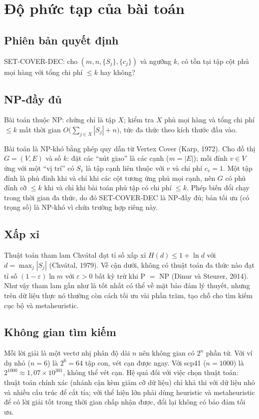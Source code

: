 \documentclass[a4paper,12pt]{article}
\begin{document}
\section{Độ phức tạp của bài toán}
\subsection{Phiên bản quyết định}
SET-COVER-DEC: cho $(m,n,\{S_j\},\{c_j\})$ và ngưỡng $k$, có tồn tại tập cột phủ mọi hàng với tổng chi phí $\le k$ hay không?

\subsection{NP-đầy đủ}
Bài toán thuộc NP: chứng chỉ là tập $X$; kiểm tra $X$ phủ mọi hàng và tổng chi phí $\le k$ mất thời gian $O\bigl(\sum_{j\in X}|S_j|+n\bigr)$, tức đa thức theo kích thước đầu vào.

Bài toán là NP-khó bằng phép quy dẫn từ Vertex Cover (Karp, 1972). Cho đồ thị $G=(V,E)$ và số $k$: đặt các ``nút giao'' là các cạnh ($m=|E|$); mỗi đỉnh $v\in V$ ứng với một ``vị trí'' có $S_v$ là tập cạnh liên thuộc với $v$ và chi phí $c_v=1$. Một tập đỉnh là phủ đỉnh khi và chỉ khi các cột tương ứng phủ mọi cạnh, nên $G$ có phủ đỉnh cỡ $\le k$ khi và chỉ khi bài toán phủ tập có chi phí $\le k$. Phép biến đổi chạy trong thời gian đa thức, do đó SET-COVER-DEC là NP-đầy đủ; bản tối ưu (có trọng số) là NP-khó vì chứa trường hợp riêng này.

\subsection{Xấp xỉ}
Thuật toán tham lam Chvátal đạt tỉ số xấp xỉ $H(d)\le 1+\ln d$ với $d=\max_j|S_j|$ (Chvátal, 1979). Về cận dưới, không có thuật toán đa thức nào đạt tỉ số $(1-\varepsilon)\ln m$ với $\varepsilon>0$ bất kỳ trừ khi P $=$ NP (Dinur và Steurer, 2014). Như vậy tham lam gần như là tốt nhất có thể về mặt bảo đảm lý thuyết, nhưng trên dữ liệu thực nó thường còn cách tối ưu vài phần trăm, tạo chỗ cho tìm kiếm cục bộ và metaheuristic.

\subsection{Không gian tìm kiếm}
Mỗi lời giải là một vectơ nhị phân độ dài $n$ nên không gian có $2^n$ phần tử. Với ví dụ nhỏ ($n=6$) là $2^6=64$ tập con, vét cạn được ngay. Với scp41 ($n=1000$) là $2^{1000}\approx 1{,}07\times10^{301}$, không thể vét cạn. Hệ quả đối với việc chọn thuật toán: thuật toán chính xác (nhánh cận kèm giảm cỡ dữ liệu) chỉ khả thi với dữ liệu nhỏ và nhiều cấu trúc để cắt tỉa; với thể hiện lớn phải dùng heuristic và metaheuristic để có lời giải tốt trong thời gian chấp nhận được, đổi lại không có bảo đảm tối ưu.
\end{document}
